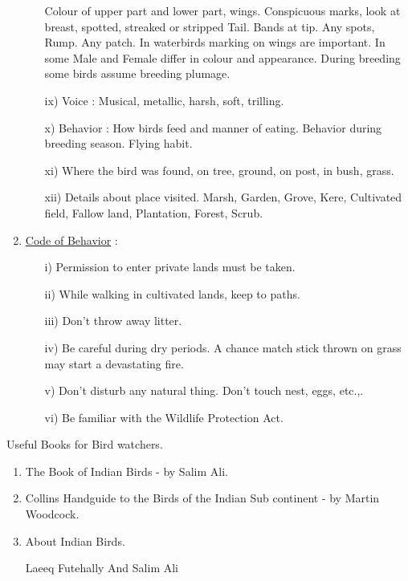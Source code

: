 \begin{enumerate}
\begin{itemize}
Colour of upper part and lower part, wings. Conspicuous 
marks, look at breast, spotted, streaked or stripped 
Tail. Bands at tip. Any spots, Rump. Any patch. 
In waterbirds marking on wings are important. In some 
Male and Female differ in colour and appearance. During 
breeding some birds assume breeding plumage. 

\item[ix)] Voice : Musical, metallic, harsh, soft, trilling. 

\item[x)] Behavior : How birds feed and manner of eating. Behavior 
during breeding season. Flying habit. 

\item[xi)] Where the bird was found, on tree, ground, on post, in 
bush, grass. 

\item[xii)] Details about place visited. Marsh, Garden, Grove, 
Kere, Cultivated field, Fallow land, Plantation, Forest, 
Scrub. 
\end{itemize}

\item \underline{Code of Behavior} : 
\begin{itemize}
\item[i)] Permission to enter private lands must be taken. 

\item[ii)] While walking in cultivated lands, keep to paths. 

\item[iii)] Don't throw away litter. 

\item[iv)] Be careful during dry periods. A chance match stick 
thrown on grass may start a devastating fire. 

\item[v)] Don't disturb any natural thing. Don't touch nest, eggs, 
etc.,.

\item[vi)] Be familiar with the Wildlife Protection Act. 
\end{itemize}
\end{enumerate}

Useful Books for Bird watchers. 
\begin{enumerate}
\item The Book of Indian Birds - by Salim Ali. 

\item Collins Handguide to the Birds of the Indian Sub continent - by Martin Woodcock. 

\item About Indian Birds. 

Laeeq Futehally And Salim Ali 
\end{enumerate}
